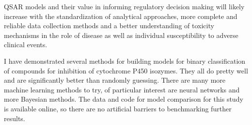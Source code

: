 

QSAR models and their value in informing regulatory decision making will likely increase with the standardization of analytical approaches, more complete and reliable data collection methods and a better understanding of toxicity mechanisms in the role of disease as well as individual susceptibility to adverse clinical events. \cite{Kruhlak2012}

I have demonstrated several methods for building models for binary classification of compounds for inhibition of cytochrome P450 isozymes. They all do pretty well and are significantly better than randomly guessing.
There are many more machine learning methods to try, of particular interest are neural networks and more Bayesian methods. The data and code for model comparison for this study is available online, so there are no artificial barriers to benchmarking further results.


